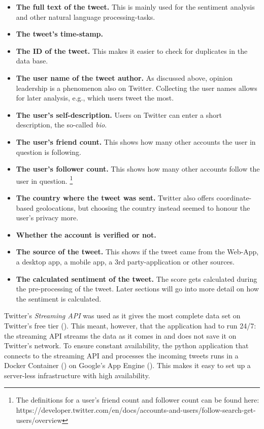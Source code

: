 \begin{itemize}
\item \textbf{The full text of the tweet.} This is mainly used for the sentiment analysis and other natural language processing-tasks.
\item \textbf{The tweet's time-stamp.}
\item \textbf{The ID of the tweet.} This makes it easier to check for duplicates in the data base. 
\item \textbf{The user name of the tweet author.} As discussed above, opinion leadership is a phenomenon also on Twitter. Collecting the user names allows for later analysis, e.g., which users tweet the most.
\item \textbf{The user's self-description.} Users on Twitter can enter a short description, the so-called \emph{bio}.
\item \textbf{The user's friend count.} This shows how many other accounts the user in question is following.
\item \textbf{The user's follower count.} This shows how many other accounts follow the user in question. \footnote{The definitions for a user's friend count and follower count can be found here: https://developer.twitter.com/en/docs/accounts-and-users/follow-search-get-users/overview}
\item \textbf{The country where the tweet was sent.} Twitter also offers coordinate-based geolocations, but choosing the country instead seemed to honour the user's privacy more.
\item \textbf{Whether the account is verified or not.}
\item \textbf{The source of the tweet.} This shows if the tweet came from the Web-App, a desktop app, a mobile app, a 3rd party-application or other sources.
\item \textbf{The calculated sentiment of the tweet.} The score gets calculated during the pre-processing of the tweet. Later sections will go into more detail on how the sentiment is calculated.
\end{itemize}


Twitter's \emph{Streaming API} was used as it gives the most complete data set on Twitter's free tier (\cite{bruns_twitter_2014}). This meant, however, that the application had to run 24/7: the streaming API streams the data as it comes in and does not save it on Twitter's network. To ensure constant availability, the python application that connects to the streaming API and processes the incoming tweets runs in a Docker Container (\cite{merkel2014docker}) on Google's App Engine (\cite{google_app_2020}). This makes it easy to set up a server-less infrastructure with high availability.

